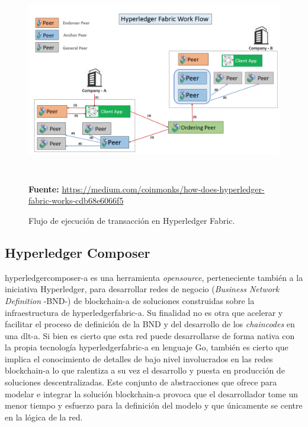 \documentclass[12pt,a4paper, twoside]{report}
\begin{document}
	
	 \begin{figure}[!ht]   
		\caption{Flujo de ejecución de transacción en Hyperledger Fabric.} 
		\begin{center} 
			\includegraphics[width=15cm,height=9cm]{Images/stateArt/hf_flow} \\
			\label{fig:stateArt_hfflow} 
			\textbf{Fuente:} \url{https://medium.com/coinmonks/how-does-hyperledger-fabric-works-cdb68e6066f5}
		\end{center}  
	\end{figure}
			
	\subsection{Hyperledger Composer}

	\gls{hyperledgercomposer-a} es una herramienta \textit{\gls{opensource}}, perteneciente también a la iniciativa Hyperledger, para desarrollar redes de negocio (\textit{Business Network Definition} -BND-) de \gls{blockchain-a} de soluciones construidas sobre la infraestructura de \gls{hyperledgerfabric-a}. Su finalidad no es otra que acelerar y facilitar el proceso de definición de la BND y del desarrollo de los \textit{chaincodes} en una \gls{dlt-a}. Si bien es cierto que esta red puede desarrollarse de forma nativa con la propia tecnología \gls{hyperledgerfabric-a} en lenguaje Go, también es cierto que implica el conocimiento de detalles de bajo nivel involucrados en las redes \gls{blockchain-a} lo que ralentiza a su vez el desarrollo y puesta en producción de soluciones descentralizadas. Este conjunto de abstracciones que ofrece para modelar e integrar la solución \gls{blockchain-a} provoca que el desarrollador tome un menor tiempo y esfuerzo para la definición del modelo y que únicamente se centre en la lógica de la red. \\
	
\end{document}
